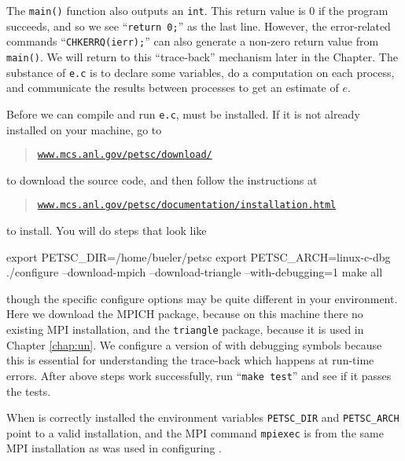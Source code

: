 The \texttt{main()} function also outputs an \texttt{int}.  This return value is $0$ if the program succeeds, and so we see ``\texttt{return 0;}'' as the last line.  However, the error-related commands ``\texttt{CHKERRQ(ierr);}'' can also generate a non-zero return value from \texttt{main()}.  We will return to this ``trace-back'' mechanism later in the Chapter.  The substance of \texttt{e.c} is to declare some variables, do a computation on each process, and communicate the results between processes to get an estimate of $e$.



Before we can compile and run \texttt{e.c}, \PETSc must be installed.  If it is not already installed on your machine, go to
\begin{quote}
\href{http://www.mcs.anl.gov/petsc/download/index.html}{\texttt{www.mcs.anl.gov/petsc/download/}}
\end{quote}
to download the source code, and then follow the instructions at
\begin{quote}
\href{http://www.mcs.anl.gov/petsc/documentation/installation.html}{\texttt{www.mcs.anl.gov/petsc/documentation/installation.html}}
\end{quote}
to install.  You will do steps that look like
\begin{cline}
export PETSC_DIR=/home/bueler/petsc
export PETSC_ARCH=linux-c-dbg
./configure --download-mpich --download-triangle --with-debugging=1
make all
\end{cline}
though the specific configure options may be quite different in your environment.  Here we download the MPICH package, because on this machine there no existing MPI installation, and the \texttt{triangle} package, because it is used in Chapter \ref{chap:un}.  We configure a version of \PETSc with debugging symbols because this is essential for understanding the trace-back which happens at run-time errors.  After above steps work successfully, run ``\texttt{make test}'' and see if it passes the tests.

When \PETSc is correctly installed the environment variables \texttt{PETSC\_DIR} and \texttt{PETSC\_ARCH} point to a valid installation, and the MPI command \texttt{mpiexec} is from the same MPI installation as was used in configuring \PETSc.

